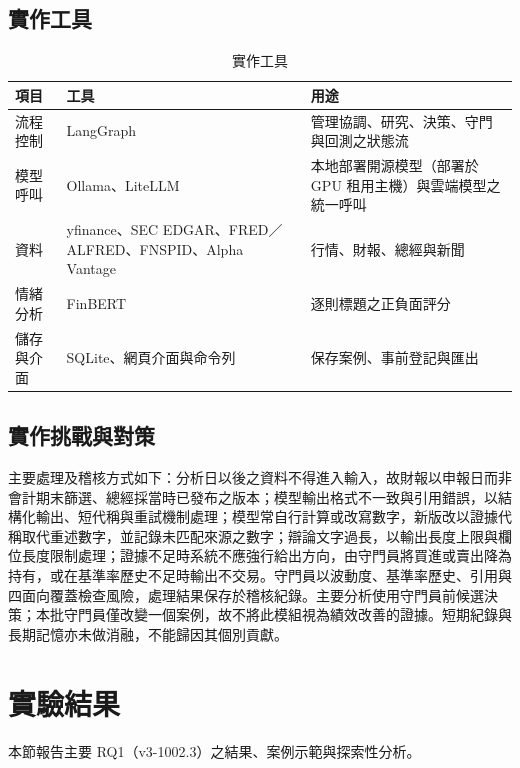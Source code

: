 \documentclass[12pt,a4paper]{article}
\begin{document}
\begin{CJK}{UTF8}{bkai}
\subsection{實作工具}

\begin{table}[H]
\centering\small
\caption{實作工具}
\label{tab:tools}
\begin{tabularx}{\textwidth}{@{}l l Y@{}}
\toprule
項目 & 工具 & 用途 \\
\midrule
流程控制 & LangGraph & 管理協調、研究、決策、守門與回測之狀態流 \\
模型呼叫 & Ollama、LiteLLM & 本地部署開源模型（部署於 GPU 租用主機）與雲端模型之統一呼叫 \\
資料 & yfinance、SEC EDGAR、FRED／ALFRED、FNSPID、Alpha Vantage & 行情、財報、總經與新聞 \\
情緒分析 & FinBERT & 逐則標題之正負面評分 \\
儲存與介面 & SQLite、網頁介面與命令列 & 保存案例、事前登記與匯出 \\
\bottomrule
\end{tabularx}
\end{table}

\subsection{實作挑戰與對策}

主要處理及稽核方式如下：分析日以後之資料不得進入輸入，故財報以申報日而非會計期末篩選、總經採當時已發布之版本；模型輸出格式不一致與引用錯誤，以結構化輸出、短代稱與重試機制處理；模型常自行計算或改寫數字，新版改以證據代稱取代重述數字，並記錄未匹配來源之數字；辯論文字過長，以輸出長度上限與欄位長度限制處理；證據不足時系統不應強行給出方向，由守門員將買進或賣出降為持有，或在基準率歷史不足時輸出不交易。守門員以波動度、基準率歷史、引用與四面向覆蓋檢查風險，處理結果保存於稽核紀錄。主要分析使用守門員前候選決策；本批守門員僅改變一個案例，故不將此模組視為績效改善的證據。短期紀錄與長期記憶亦未做消融，不能歸因其個別貢獻。



\section{實驗結果}
\label{sec:results}

本節報告主要 RQ1（v3-1002.3）之結果、案例示範與探索性分析。


\end{CJK}
\end{document}
